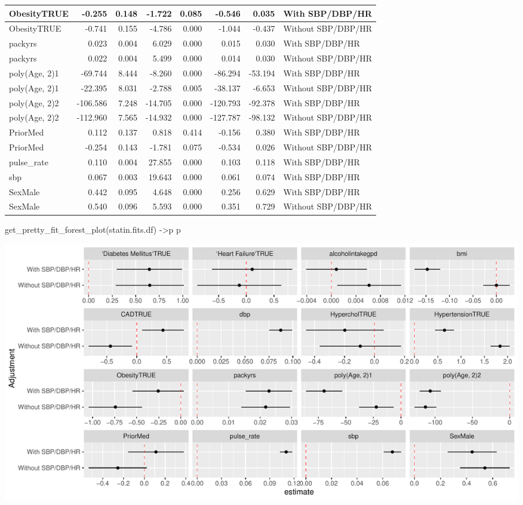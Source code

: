 \documentclass[
]{article}
\newenvironment{Shaded}{\begin{snugshade}}{\end{snugshade}}
\newcommand{\FunctionTok}[1]{\textcolor[rgb]{0.00,0.00,0.00}{#1}}
\newcommand{\NormalTok}[1]{#1}
\newcommand{\OtherTok}[1]{\textcolor[rgb]{0.56,0.35,0.01}{#1}}
\begin{document}
\begin{table}
\begin{tabular}[t]{l|r|r|r|r|r|r|l}
\hline
ObesityTRUE & -0.255 & 0.148 & -1.722 & 0.085 & -0.546 & 0.035 & With SBP/DBP/HR\\
\hline
ObesityTRUE & -0.741 & 0.155 & -4.786 & 0.000 & -1.044 & -0.437 & Without SBP/DBP/HR\\
\hline
packyrs & 0.023 & 0.004 & 6.029 & 0.000 & 0.015 & 0.030 & With SBP/DBP/HR\\
\hline
packyrs & 0.022 & 0.004 & 5.499 & 0.000 & 0.014 & 0.030 & Without SBP/DBP/HR\\
\hline
poly(Age, 2)1 & -69.744 & 8.444 & -8.260 & 0.000 & -86.294 & -53.194 & With SBP/DBP/HR\\
\hline
poly(Age, 2)1 & -22.395 & 8.031 & -2.788 & 0.005 & -38.137 & -6.653 & Without SBP/DBP/HR\\
\hline
poly(Age, 2)2 & -106.586 & 7.248 & -14.705 & 0.000 & -120.793 & -92.378 & With SBP/DBP/HR\\
\hline
poly(Age, 2)2 & -112.960 & 7.565 & -14.932 & 0.000 & -127.787 & -98.132 & Without SBP/DBP/HR\\
\hline
PriorMed & 0.112 & 0.137 & 0.818 & 0.414 & -0.156 & 0.380 & With SBP/DBP/HR\\
\hline
PriorMed & -0.254 & 0.143 & -1.781 & 0.075 & -0.534 & 0.026 & Without SBP/DBP/HR\\
\hline
pulse\_rate & 0.110 & 0.004 & 27.855 & 0.000 & 0.103 & 0.118 & With SBP/DBP/HR\\
\hline
sbp & 0.067 & 0.003 & 19.643 & 0.000 & 0.061 & 0.074 & With SBP/DBP/HR\\
\hline
SexMale & 0.442 & 0.095 & 4.648 & 0.000 & 0.256 & 0.629 & With SBP/DBP/HR\\
\hline
SexMale & 0.540 & 0.096 & 5.593 & 0.000 & 0.351 & 0.729 & Without SBP/DBP/HR\\
\hline
\end{tabular}
\end{table}

\begin{Shaded}
\begin{Highlighting}[]
\FunctionTok{get\_pretty\_fit\_forest\_plot}\NormalTok{(statin.fits.df) }\OtherTok{{-}\textgreater{}}\NormalTok{p}
\NormalTok{p}
\end{Highlighting}
\end{Shaded}

\includegraphics{../results/report_files/figure-latex/statin-fit-forest-1.pdf}
\end{document}
